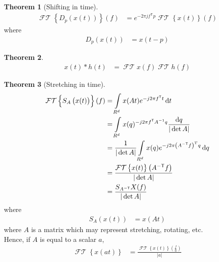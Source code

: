 \documentclass[titlepage, fleqn, a4paper, 12pt, twoside]{article}
\theoremstyle{definition}
\theoremstyle{theorem}
\newtheorem{theorem}{Theorem}
\DeclareMathOperator{\FT}{\mathcal{FT}}
\def\transpose#1{{#1}^{\mathsf{T}}}
\def\minustranspose#1{{#1}^{\mathsf{-T}}}
\begin{document}
\begin{theorem}[Shifting in time]
	\begin{align*}
		\FT\left\{ D_p\left( x(t) \right) \right\}(f) &= e^{-2 \pi j \transpose{f} p} \FT\left\{ x(t) \right\}(f)
	\end{align*}
	where
	\begin{align*}
		D_p\left( x(t) \right) &= x(t - p)
	\end{align*}
	\label{thm:shifting_in_time}
\end{theorem}

\begin{theorem}
	\begin{align*}
		x(t) \ast h(t) &= \FT{x}(f) \FT{h}(f)
	\end{align*}
	\label{thm:convolution_in_time_multiplication_in_frequency}
\end{theorem}

\begin{theorem}[Stretching in time]
	\begin{align*}
		\FT\left\{ S_A\left( x(t) \right) \right\}(f) &= \int\limits_{R^d} x(A t) e^{-j 2 \pi \transpose{f} t} \dif t\\
		&= \int\limits_{R^d} x(q) ^{-j 2 \pi \transpose{f} A^{-1} q} \frac{\dif q}{|\det A|}\\
		&= \frac{1}{|\det A|} \int\limits_{R^d}  x(q) e^{-j 2 \pi \left( \minustranspose{A} f \right)^T q} \dif q\\
		&= \frac{\FT\left\{ x(t) \right\}\left( \minustranspose{A} f \right)}{|\det A|}\\
		&= \frac{S_{\minustranspose{A}} X(f)}{|\det A|}
	\end{align*}
	where
	\begin{align*}
		S_A\left( x(t) \right) &= x(A t)
	\end{align*}
	where $A$ is a matrix which may represent stretching, rotating, etc.\\
	Hence, if $A$ is equal to a scalar $a$,
	\begin{align*}
		\FT\left\{ x(a t) \right\} &= \frac{\FT\left\{ x(t) \right\}\left( \frac{f}{a} \right)}{|a|}
	\end{align*}
	\label{thm:stretching_in_time}
\end{theorem}
\end{document}
